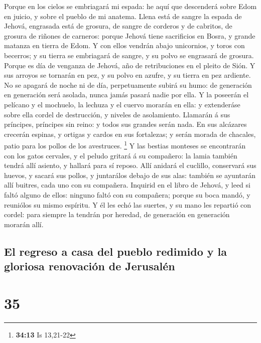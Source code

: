  Porque en los cielos se embriagará mi espada: he aquí que
descenderá sobre Edom en juicio, y sobre el pueblo de mi anatema.
 Llena está de sangre la espada de Jehová, engrasada está
de grosura, de sangre de corderos y de cabritos, de grosura de riñones
de carneros: porque Jehová tiene sacrificios en Bosra, y grande matanza
en tierra de Edom.  Y con ellos vendrán abajo unicornios,
y toros con becerros; y su tierra se embriagará de sangre, y su polvo se
engrasará de grosura.  Porque es día de venganza de
Jehová, año de retribuciones en el pleito de Sión.  Y sus
arroyos se tornarán en pez, y su polvo en azufre, y su tierra en pez
ardiente.  No se apagará de noche ni de día,
perpetuamente subirá su humo: de generación en generación será asolada,
nunca jamás pasará nadie por ella.  Y la poseerán el
pelícano y el mochuelo, la lechuza y el cuervo morarán en ella: y
extenderáse sobre ella cordel de destrucción, y niveles de asolamiento.
 Llamarán á sus príncipes, príncipes sin reino: y todos
sus grandes serán nada.  En sus alcázares crecerán
espinas, y ortigas y cardos en sus fortalezas; y serán morada de
chacales, patio para los pollos de los avestruces. \footnote{\textbf{34:13}
  Is 13,21-22}  Y las bestias monteses se encontrarán con
los gatos cervales, y el peludo gritará á su compañero: la lamia también
tendrá allí asiento, y hallará para sí reposo.  Allí
anidará el cuclillo, conservará sus huevos, y sacará sus pollos, y
juntarálos debajo de sus alas: también se ayuntarán allí buitres, cada
uno con su compañera.  Inquirid en el libro de Jehová, y
leed si faltó alguno de ellos: ninguno faltó con su compañera; porque su
boca mandó, y reuniólos su mismo espíritu.  Y él les echó
las suertes, y su mano les repartió con cordel: para siempre la tendrán
por heredad, de generación en generación morarán allí.

\hypertarget{el-regreso-a-casa-del-pueblo-redimido-y-la-gloriosa-renovaciuxf3n-de-jerusaluxe9n}{%
\subsection{El regreso a casa del pueblo redimido y la gloriosa
renovación de
Jerusalén}\label{el-regreso-a-casa-del-pueblo-redimido-y-la-gloriosa-renovaciuxf3n-de-jerusaluxe9n}}

\hypertarget{section-34}{%
\section{35}\label{section-34}}

